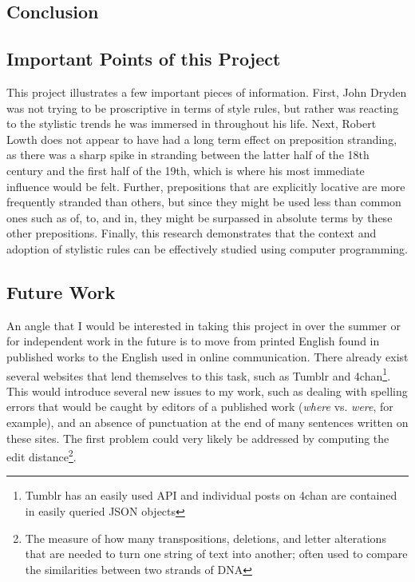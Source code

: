 \documentclass[DIV=calc, paper=letter, fontsize=12pt]{scrartcl}	 %
\begin{document}
\begin{multicols}{2}
\section{Conclusion}

\subsection{Important Points of this Project}
This project illustrates a few important pieces of information. First, John Dryden was not trying to be proscriptive in terms of style rules, but rather was reacting to the stylistic trends he was immersed in throughout his life. Next, Robert Lowth does not appear to have had a long term effect on preposition stranding, as there was a sharp spike in stranding between the latter half of the 18th century and the first half of the 19th, which is where his most immediate influence would be felt. Further, prepositions that are explicitly locative are more frequently stranded than others, but since they might be used less than common ones such as of, to, and in, they might be surpassed in absolute terms by these other prepositions. Finally, this research demonstrates that the context and adoption of stylistic rules can be effectively studied using computer programming. 

\subsection{Future Work}
An angle that I would be interested in taking this project in over the summer or for independent work
in the future is to move from printed English found in published works to the English used in 
online communication. There already exist several websites that lend themselves to this task, such
as Tumblr and 4chan\footnote{Tumblr has an easily used API and individual posts on 4chan are contained in easily queried JSON objects}.
This would introduce several new issues to my work, such as dealing with spelling errors 
that would be caught by editors of a published work (\emph{where} vs. \emph{were}, for example), 
and an absence of punctuation at the end of many sentences written on these sites. The first problem 
could very likely be addressed by computing the edit distance\footnote{The measure of how many 
transpositions, deletions, and letter alterations that are needed to turn one string of text into another; often used to compare the similarities between two strands of DNA}. 


\end{multicols}
\end{document}
